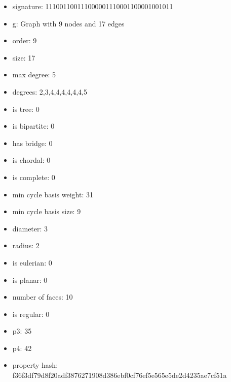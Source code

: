 \newpage
\begin{figure}
\end{figure}
\begin{itemize}
\item signature: 111001100111000001110001100001001011
\item g: Graph with 9 nodes and 17 edges
\item order: 9
\item size: 17
\item max degree: 5
\item degrees: 2,3,4,4,4,4,4,4,5
\item is tree: 0
\item is bipartite: 0
\item has bridge: 0
\item is chordal: 0
\item is complete: 0
\item min cycle basis weight: 31
\item min cycle basis size: 9
\item diameter: 3
\item radius: 2
\item is eulerian: 0
\item is planar: 0
\item number of faces: 10
\item is regular: 0
\item p3: 35
\item p4: 42
\item property hash: f36f3df79d8f20adf3876271908d386ebf0cf76ef5e565e5de2d4235ae7cf51a
\end{itemize}
